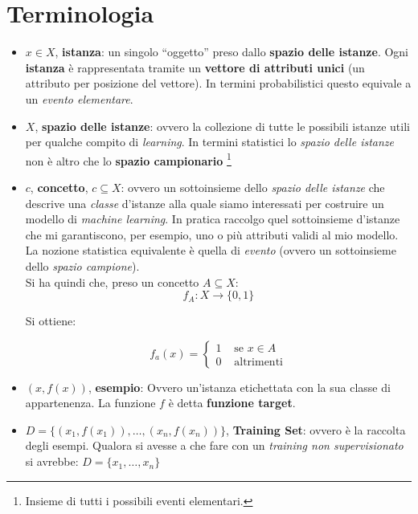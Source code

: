 \section{Terminologia}
\begin{shaded}
  \begin{itemize}
  
    \item $x\in X$, \textbf{istanza}: un singolo ``oggetto'' preso dallo
    \textbf{spazio delle istanze}. Ogni \textbf{istanza} è rappresentata tramite
    un \textbf{vettore di attributi unici} (un attributo per posizione del
    vettore). In termini probabilistici questo equivale a un \textit{evento elementare}.
    
    \item $X$, \textbf{spazio delle istanze}: ovvero la collezione di tutte le
    possibili istanze utili per qualche compito di \textit{learning}. 
    In termini statistici lo \textit{spazio delle istanze} non è altro che lo 
    \textbf{spazio campionario} \footnote{Insieme di tutti i possibili eventi elementari.}
    
    \item $c$, \textbf{concetto}, $c\subseteq X$: ovvero un sottoinsieme dello \textit{spazio delle istanze} che descrive una \textit{classe} d'istanze alla quale siamo interessati per costruire un modello di \textit{machine learning}. In pratica raccolgo quel sottoinsieme d'istanze che mi garantiscono, per esempio, uno o più attributi validi al mio modello. La nozione statistica equivalente è quella di \textit{evento} (ovvero un sottoinsieme dello \textit{spazio campione}).\\ 
    Si ha quindi che, preso un concetto $A\subseteq X$:
    \[f_A:X\to\{0,1\}\]
    
    Si ottiene: 
    
    \[f_a(x)=
      \begin{cases}
        1& \mbox{ se } x\in A\\
        0& \mbox{ altrimenti}
      \end{cases}
    \]
    
    \item $(x, f(x))$, \textbf{esempio}: Ovvero un'istanza etichettata con la sua classe di appartenenza. La funzione $f$ è detta \textbf{funzione target}.
    
    \item $D=\{(x_1,f(x_1)),\ldots,(x_n,f(x_n))\}$, \textbf{Training Set}:
    ovvero è la raccolta degli esempi. Qualora si avesse a che fare con un \textit{training non supervisionato} si avrebbe:
    $D=\{x_1,\ldots,x_n\}$
    

\end{itemize}
\end{shaded}
